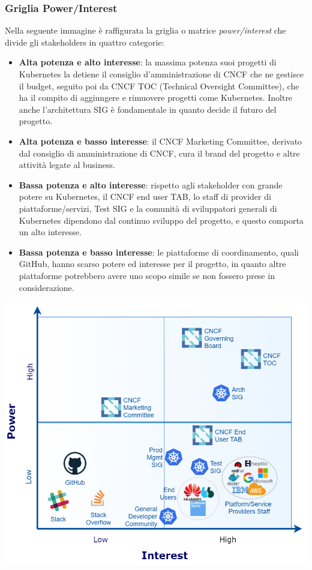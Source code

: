 \documentclass[12pt, a4paper]{report}
\begin{document}
\subsubsection{Griglia Power/Interest}
Nella seguente immagine è raffigurata la griglia o matrice \textit{power/interest} che divide gli stakeholders in quattro categorie:
\begin{itemize}
  \item \textbf{Alta potenza e alto interesse}: la massima potenza suoi progetti di Kubernetes la detiene il consiglio d'amministrazione di CNCF che ne gestisce il budget, seguito poi da CNCF TOC (Technical Oversight Committee), che ha il compito di aggiungere e rimuovere progetti come Kubernetes. Inoltre anche l'architettura SIG è fondamentale in quanto decide il futuro del progetto.
  \item \textbf{Alta potenza e basso interesse}: il CNCF Marketing Committee, derivato dal consiglio di amministrazione di CNCF, cura il brand del progetto e altre attività legate al business.
  \item \textbf{Bassa potenza e alto interesse}: rispetto agli stakeholder con grande potere su Kubernetes, il CNCF end user TAB, lo staff di provider di piattaforme/servizi, Test SIG e la comunità di sviluppatori generali di Kubernetes dipendono dal continuo sviluppo del progetto, e questo comporta un alto interesse.
  \item \textbf{Bassa potenza e basso interesse}: le piattaforme di coordinamento, quali GitHub, hanno scarso potere ed interesse per il progetto, in quanto altre piattaforme potrebbero avere uno scopo simile se non fossero prese in considerazione.
\end{itemize}
\begin{center}
  \includegraphics[scale = 0.45]{Images/power-interest}
\end{center}
\end{document}
